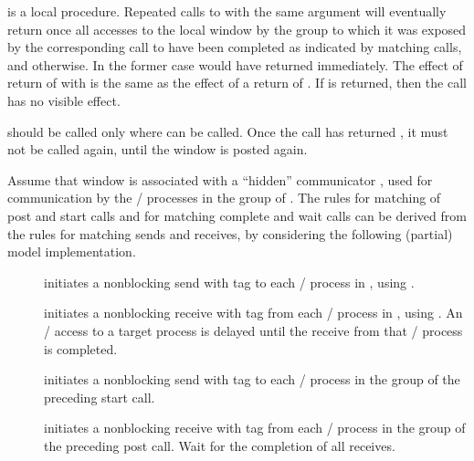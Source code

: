  is a local procedure.
Repeated calls to  with the same  argument
will eventually return  once all accesses to the
local window by the group to which it was exposed by the corresponding call to
 have been completed as indicated by matching
 calls, and  otherwise.
In the former case 
would have returned immediately.
The effect of return of  with
 is the same as the effect of a return 
of .  If  is returned,
then the call has no visible effect.

 should be called only where
can be called.
Once the call has returned , it must not be
called again, until the window is posted again.

Assume that window  is associated with a ``hidden'' 
communicator , used for communication by the \mpi/ processes
in the group of .  The rules for matching of post and start calls and
for matching complete and wait calls can be
derived from the rules for 
matching sends and receives, by considering the following (partial) model
implementation. 

\begin{description}
\item[]
initiates a nonblocking send with tag  to each
\mpi/ process in , using .
\item[]
initiates a nonblocking receive with tag  from each \mpi/
process in , using .  An \RMA/ access to
a target process is delayed until the receive
from that \mpi/ process is completed.
\item[]
initiates a nonblocking send with tag  to each \mpi/ process in
the group of the preceding start call.
\item[]
initiates a nonblocking receive with tag  from each
\mpi/ process in the group of the preceding post call.  Wait for the
completion of all receives. 
\end{description}

